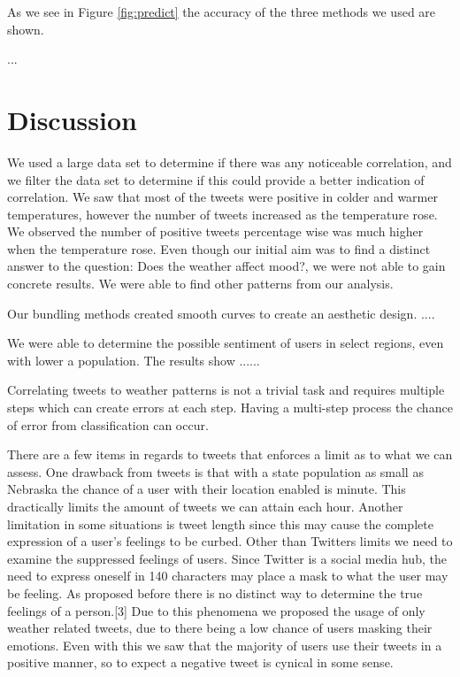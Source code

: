 \documentclass[journal]{vgtc}                %
\begin{document}
As we see in Figure \ref{fig:predict} the accuracy of the three methods we used are shown. 


\newpage

...\newpage


\section{Discussion}
We used a large data set to determine if there was any noticeable correlation, and we filter the data set to determine if this could provide a better indication of correlation. We saw that most of the tweets were positive in colder and warmer temperatures, however the number of tweets increased as the temperature rose. We observed the number of positive tweets percentage wise was much higher when the temperature rose. Even though our initial aim was to find a distinct answer to the question: Does the weather affect mood?, we were not able to gain concrete results. We were able to find other patterns from our analysis. 

Our bundling methods created smooth curves to create an aesthetic design. ....

We were able to determine the possible sentiment of users in select regions, even with lower a population. The results show ......

Correlating tweets to weather patterns is not a trivial task and requires multiple steps which can create errors at each step. Having a multi-step process the chance of error from classification can occur. 

There are a few items in regards to tweets that enforces a limit as to what we can assess. One drawback from tweets is that with a state population as small as Nebraska the chance of a user with their location enabled is minute. This dractically limits the amount of tweets we can attain each hour. Another limitation in some situations is tweet length since this may cause the complete expression of a user's feelings to be curbed. Other than Twitters limits we need to examine the suppressed feelings of users. Since Twitter is a social media hub, the need to express oneself in 140 characters may place a mask to what the user may be feeling. As proposed before there is no distinct way to determine the true feelings of a person.[3] Due to this phenomena we proposed the usage of only weather related tweets, due to there being a low chance of users masking their emotions. Even with this we saw that the majority of users use their tweets in a positive manner, so to expect a negative tweet is cynical in some sense.
\end{document}

